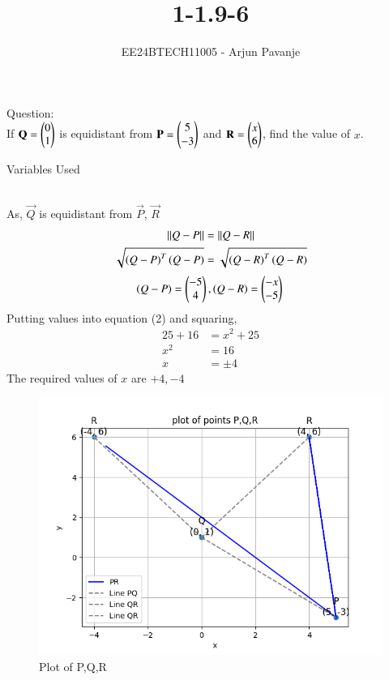 \documentclass[journal]{IEEEtran}
\begin{document}

\vspace{3cm}

\title{1-1.9-6}
\author{EE24BTECH11005 - Arjun Pavanje
}
{\let\newpage\relax\maketitle}
Question:\\
If $\mathbf{Q}=\begin{pmatrix}0\\1\end{pmatrix}$ is equidistant from $\mathbf{P}=\begin{pmatrix}5\\-3\end{pmatrix}$ and $\mathbf{R}=\begin{pmatrix}x\\6\end{pmatrix}$, find the value of $x$.\\
\solution
\begin{table}[h!]    
  \centering
  
  \caption{Variables Used}
  \label{tab1-1.9-6}
\end{table}\\
As, $\vec{Q}$ is equidistant from $\vec{P}$, $\vec{R}$\\
\begin{align}
	\left\lVert Q-P\right\rVert &= \left\lVert Q-R\right\rVert\\
		\sqrt{\left(Q-P\right)^T\left(Q-P\right)}&=\sqrt{\left(Q-R\right)^T\left(Q-R\right)}
\end{align}
$$		\left(Q-P\right) = \begin{pmatrix}
			-5\\
			4
		\end{pmatrix},
		\left(Q-R\right)=\begin{pmatrix}
			-x\\
			-5
		\end{pmatrix}\\
$$
Putting values into equation (2) and squaring,
\begin{align}
	25+16&=x^2+25\\
	x^2&=16\\
	x &= \pm{4}
\end{align}
The required values of $x$ are $+4,-4$
\begin{figure}[h!]
   \centering
   \includegraphics[width = 1\linewidth]{figs/fig.png}
   \caption{Plot of P,Q,R}
   \label{stemplot}
\end{figure}
\end{document}
